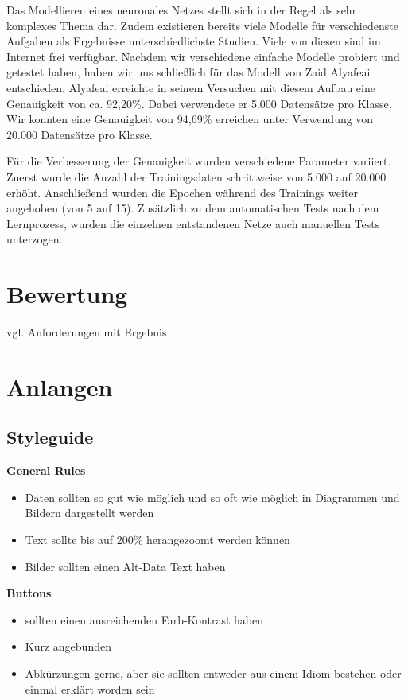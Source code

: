 \documentclass[11pt]{article}
\begin{document}
Das Modellieren eines neuronales Netzes stellt sich in der Regel als sehr komplexes Thema dar. Zudem existieren bereits viele Modelle für verschiedenste Aufgaben als Ergebnisse unterschiedlichste Studien. Viele von diesen sind im Internet frei verfügbar. Nachdem wir verschiedene einfache Modelle probiert und getestet haben, haben wir uns schließlich für das Modell von Zaid Alyafeai\parencite{ZaidAlyafeai2018} entschieden. Alyafeai erreichte in seinem Versuchen mit diesem Aufbau eine Genauigkeit von ca. 92,20\%. Dabei verwendete er 5.000 Datensätze pro Klasse. Wir konnten eine Genauigkeit von   94,69\% erreichen unter Verwendung von 20.000 Datensätze pro Klasse.

Für die Verbesserung der Genauigkeit wurden verschiedene Parameter variiert. Zuerst wurde die Anzahl der Trainingsdaten schrittweise von 5.000 auf 20.000 erhöht. Anschließend wurden die Epochen während des Trainings weiter angehoben (von 5 auf 15). 
Zusätzlich zu dem automatischen Tests nach dem Lernprozess, wurden die einzelnen entstandenen Netze auch manuellen Tests unterzogen.
\pagebreak

\section{Bewertung}
vgl. Anforderungen mit Ergebnis
\pagebreak

\section{Anlangen}
\label{chap: Anlagen}
\subsection{Styleguide}


\textbf{General Rules}
\begin{itemize}
\item Daten sollten so gut wie möglich und so oft wie möglich in Diagrammen und Bildern dargestellt werden
\item Text sollte bis auf 200\% herangezoomt werden können \item Bilder sollten einen Alt-Data Text haben\\
\end{itemize}

\textbf{Buttons}
\begin{itemize}
\item sollten einen ausreichenden Farb-Kontrast haben
\item Kurz angebunden
\item Abkürzungen gerne, aber sie sollten entweder aus einem Idiom bestehen oder einmal erklärt worden sein\\
\end{itemize}
\end{document}
